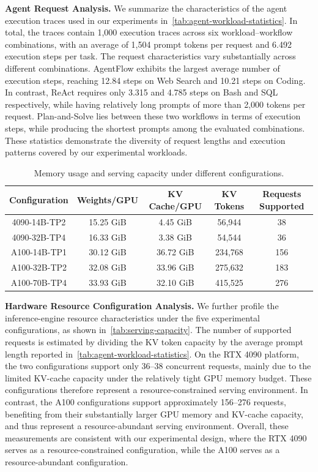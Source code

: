 \textbf{Agent Request Analysis.} We summarize the characteristics of the agent execution traces used in our experiments in~\autoref{tab:agent-workload-statistics}. In total, the traces contain 1,000 execution traces across six workload--workflow combinations, with an average of 1,504 prompt tokens per request and 6.492 execution steps per task. The request characteristics vary substantially across different combinations. AgentFlow exhibits the largest average number of execution steps, reaching 12.84 steps on Web Search and 10.21 steps on Coding. In contrast, ReAct requires only 3.315 and 4.785 steps on Bash and SQL respectively, while having relatively long prompts of more than 2,000 tokens per request. Plan-and-Solve lies between these two workflows in terms of execution steps, while producing the shortest prompts among the evaluated combinations. These statistics demonstrate the diversity of request lengths and execution patterns covered by our experimental workloads.

\begin{table}[H]
    \centering
    \caption{Memory usage and serving capacity under different configurations.}
    \label{tab:serving-capacity}
    \begin{tabular}{ccccc}
        \toprule
        \textbf{Configuration} &
        \textbf{Weights/GPU} &
        \textbf{KV Cache/GPU} &
        \textbf{KV Tokens} &
        \textbf{Requests Supported} \\
        \midrule
        4090-14B-TP2 & 15.25 GiB & 4.45 GiB  & 56,944  & 38  \\
        4090-32B-TP4 & 16.33 GiB & 3.38 GiB  & 54,544  & 36  \\
        A100-14B-TP1 & 30.12 GiB & 36.72 GiB & 234,768 & 156 \\
        A100-32B-TP2 & 32.08 GiB & 33.96 GiB & 275,632 & 183 \\
        A100-70B-TP4 & 33.93 GiB & 32.10 GiB & 415,525 & 276 \\
        \bottomrule
    \end{tabular}
\end{table}

\textbf{Hardware Resource Configuration Analysis.} We further profile the inference-engine resource characteristics under the five experimental configurations, as shown in~\autoref{tab:serving-capacity}. The number of supported requests is estimated by dividing the KV token capacity by the average prompt length reported in~\autoref{tab:agent-workload-statistics}. On the RTX 4090 platform, the two configurations support only 36--38 concurrent requests, mainly due to the limited KV-cache capacity under the relatively tight GPU memory budget. These configurations therefore represent a resource-constrained serving environment. In contrast, the A100 configurations support approximately 156--276 requests, benefiting from their substantially larger GPU memory and KV-cache capacity, and thus represent a resource-abundant serving environment. Overall, these measurements are consistent with our experimental design, where the RTX 4090 serves as a resource-constrained configuration, while the A100 serves as a resource-abundant configuration.



